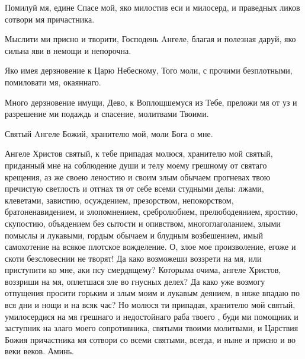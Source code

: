 \begin{mymulticols}
Помилуй мя, едине Спасе мой, яко милостив еси и милосерд, и праведных ликов сотвори мя причастника.


Мыслити ми присно и творити, Господень Aнгеле, благая и полезная даруй, яко сильна яви в немощи и непорочна.

\slava

Яко имея дерзновение к Царю Небесному, Того моли, с прочими безплотными, помиловати мя, окаяннаго.

\inyne

Много дерзновение имущи, Дево, к Воплощшемуся из Тебе, преложи мя от уз и разрешение ми подаждь и спасение, молитвами Твоими.


Святый Aнгеле Божий, хранителю мой, моли Бога о мне.

Ангеле Христов святый, к тебе припадая молюся, хранителю мой святый, приданный мне на соблюдение души и телу моему грешному от святаго крещения, аз же своею леностию и своим злым обычаем прогневах твою пречистую светлость и отгнах тя от себе всеми студными делы: лжами, клеветами, завистию, осуждением, презорством, непокорством, братоненавидением, и злопомнением, сребролюбием, прелюбодеянием, яростию, скупостию, объядением без сытости и опивством, многоглаголанием, злыми помыслы и лукавыми, гордым обычаем и блудным возбешением, имый самохотение на всякое плотское вожделение. О, злое мое произволение, егоже и скоти безсловеснии не творят! Да како возможеши воззрети на мя, или приступити ко мне, аки псу смердящему? Которыма очима, ангеле Христов, воззриши на мя, оплетшася зле во гнусных делех? Да како уже возмогу отпущения просити горьким и злым моим и лукавым деянием, в няже впадаю по вся дни и нощи и на всяк час? Но молюся ти припадая, хранителю мой святый, умилосердися на мя грешнаго и недостойнаго раба твоего , буди ми помощник и заступник на злаго моего сопротивника, святыми твоими молитвами, и Царствия Божия причастника мя сотвори со всеми святыми, всегда, и ныне и присно и во веки веков. Аминь.

\end{mymulticols}

\mychapterending


